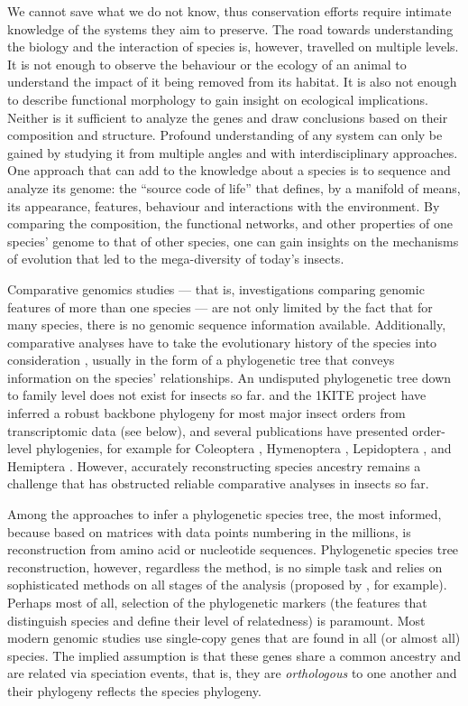 We cannot save what we do not know, thus conservation efforts require
intimate knowledge of the systems they aim to preserve. The road towards
understanding the biology and the interaction of species is, however,
travelled on multiple levels. It is not enough to observe the behaviour
or the ecology of an animal to understand the impact of it being removed
from its habitat. It is also not enough to describe functional
morphology to gain insight on ecological implications.  Neither is it
sufficient to analyze the genes and draw conclusions based on their
composition and structure. Profound understanding of any system can only
be gained by studying it from multiple angles and with interdisciplinary
approaches. One approach that can add to the knowledge about a species
is to sequence and analyze its genome: the ``source code of life'' that
defines, by a manifold of means, its appearance, features, behaviour and
interactions with the environment. By comparing the composition, the
functional networks, and other properties of one species' genome to that
of other species, one can gain insights on the mechanisms of evolution
that led to the mega-diversity of today's insects.

Comparative genomics studies --- that is, investigations comparing
genomic features of more than one species --- are not only limited by
the fact that for many species, there is no genomic sequence information
available.  Additionally, comparative analyses have to take the
evolutionary history of the species into consideration \citep{Dunn2018},
usually in the form of a phylogenetic tree that conveys information on
the species' relationships. An undisputed phylogenetic tree down to
family level does not exist for insects so far. \citet{Misof2014} and
the 1KITE project \citep{1KITE2018} have inferred a robust backbone
phylogeny for most major insect orders from transcriptomic data (see
below), and several publications have presented order-level phylogenies,
for example for Coleoptera \citep{McKenna2015}, Hymenoptera
\citep{Peters2017, Branstetter2017}, Lepidoptera \citep{Breinholt2018},
and Hemiptera \citep{Johnson2018}. However, accurately reconstructing
species ancestry remains a challenge that has obstructed reliable
comparative analyses in insects so far.

Among the approaches to infer a phylogenetic species tree, the most
informed, because based on matrices with data points numbering in the
millions, is reconstruction from amino acid or nucleotide sequences.
Phylogenetic species tree reconstruction, however, regardless the
method, is no simple task and relies on sophisticated methods on all
stages of the analysis (proposed by \citet{Misof2014}, for example).
Perhaps most of all, selection of the phylogenetic markers (the features
that distinguish species and define their level of relatedness) is
paramount.  Most modern genomic studies use single-copy genes that are
found in all (or almost all) species. The implied assumption is that
these genes share a common ancestry and are related via speciation
events, that is, they are \emph{orthologous} to one another
\citep{Koonin2005} and their phylogeny reflects the species phylogeny.

